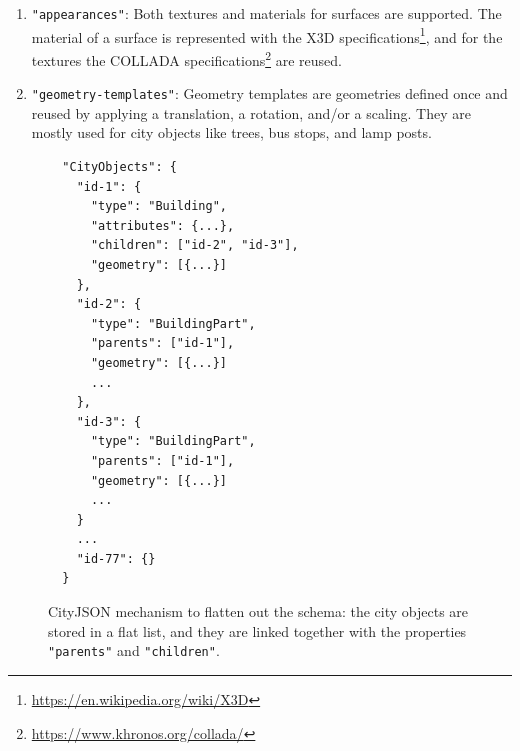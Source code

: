 \documentclass[11pt,halfparskip,parskip=half]{scrartcl}
\newcommand{\eg}{eg}
\begin{document}
\begin{enumerate}
  There are several advantages to this approach.
  First, the files can be compressed: 3D vertices are often shared by several surfaces, and repeating them can be costly, especially if they are very precise (sub-millimetre precision is often used).
  Second, this approach increases the topological relationships that are explicitly stored in the file, and several operations (\eg\ determining building adjacency) can be sped up and made more robust.
  Third, it is very easy to convert all coordinates to a representation listing; the inverse is not true.
  However, this list of vertices is the reason why the streaming of geometries is problematic, since in practice it can contain several millions vertices.
  To be able to reconstruct a single Building, all the \texttt{"vertices"} need to loaded in memory, which can mean waiting for millions of unused vertices to be deserialised.
  \item \texttt{"appearances"}: Both textures and materials for surfaces are supported.
  The material of a surface is represented with the X3D specifications\footnote{\url{https://en.wikipedia.org/wiki/X3D}}, and for the textures the COLLADA specifications\footnote{\url{https://www.khronos.org/collada/}} are reused.
  \item \texttt{"geometry-templates"}:
  Geometry templates are geometries defined once and reused by applying a translation, a rotation, and/or a scaling.
  They are mostly used for city objects like trees, bus stops, and lamp posts.
\end{enumerate}


\begin{figure}
  \centering
\begin{lstlisting}
  "CityObjects": {
    "id-1": {
      "type": "Building",
      "attributes": {...},
      "children": ["id-2", "id-3"],
      "geometry": [{...}]
    },
    "id-2": {
      "type": "BuildingPart",
      "parents": ["id-1"],
      "geometry": [{...}]
      ...
    },
    "id-3": {
      "type": "BuildingPart",
      "parents": ["id-1"],
      "geometry": [{...}]
      ...
    }
    ...
    "id-77": {}
  }
\end{lstlisting}
  \caption{CityJSON mechanism to flatten out the schema: the city objects are stored in a flat list, and they are linked together with the properties \texttt{"parents"} and \texttt{"children"}.}%
\label{fig:parents_children}
\end{figure}




%
\end{document}
